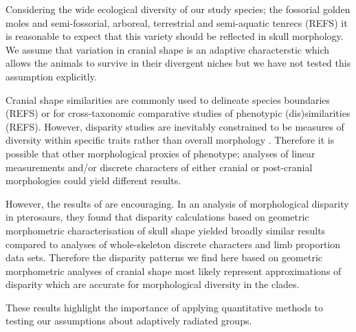 \documentclass[12pt,a4paper]{article}
\begin{document}
Considering the wide ecological diversity of our study species; the fossorial golden moles and semi-fossorial, arboreal, terrestrial and semi-aquatic tenrecs (REFS) it is reasonable to expect that this variety should be reflected in skull morphology.
We assume that variation in cranial shape is an adaptive characterstic which allows the animals to survive in their divergent niches but we have not tested this assumption explicitly. 

Cranial shape similarities are commonly used to delineate species boundaries (REFS) or for cross-taxonomic comparative studies of phenotypic (dis)similarities (REFS). However, disparity studies are inevitably constrained to be measures of diversity within specific traits rather than overall morphology \citep{Roy1997}. Therefore it is possible that other morphological proxies of phenotype; analyses of linear measurements and/or discrete characters of either cranial or post-cranial morphologies could yield different results. 

However, the results of \citep{Foth2012} are encouraging. In an analysis of morphological disparity in pterosaurs, they found that disparity calculations based on geometric morphometric characterisation of skull shape yielded broadly similar results compared to analyses of whole-skeleton discrete characters and limb proportion data sets. Therefore the disparity patterns we find here based on geometric morphometric analyses of cranial shape most likely represent approximations of disparity which are accurate for morphological diversity in the clades. 






These results highlight the importance of applying quantitative methods to testing our assumptions about adaptively radiated groups. 
\end{document}
